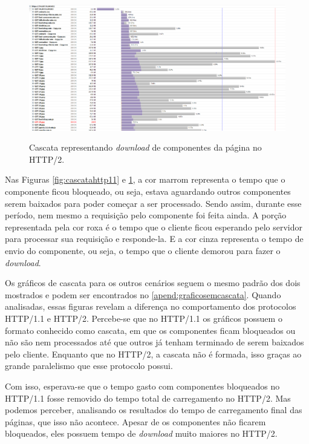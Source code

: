 \begin{landscape}
	\begin{figure}[!htbp]
    	\centering
	    \caption{Cascata representando \textit{download} de componentes da página no HTTP/2.}
    	\includegraphics[width=1.5\textwidth]{./04-figuras/analise-de-resultados/cascata_http2}
	    \label{fig:cascatahttp2}
	\end{figure}
\end{landscape}

Nas Figuras \ref{fig:cascatahttp11} e \ref{fig:cascatahttp2}, a cor marrom representa o tempo que o componente ficou bloqueado, ou seja, estava aguardando outros componentes serem baixados para poder começar a ser processado. Sendo assim, durante esse período, nem mesmo a requisição pelo componente foi feita ainda. A porção representada pela cor roxa é o tempo que o cliente ficou esperando pelo servidor para processar sua requisição e responde-la. E a cor cinza representa o tempo de envio do componente, ou seja, o tempo que o cliente demorou para fazer o \textit{download}.

Os gráficos de cascata para os outros cenários seguem o mesmo padrão dos dois mostrados e podem ser encontrados no \autoref{apend:graficosemcascata}. Quando analisadas, essas figuras revelam a diferença no comportamento dos protocolos HTTP/1.1 e HTTP/2. Percebe-se que no HTTP/1.1 os gráficos possuem o formato conhecido como cascata, em que os componentes ficam bloqueados ou não são nem processados até que outros já tenham terminado de serem baixados pelo cliente. Enquanto que no HTTP/2, a cascata não é formada, isso graças ao grande paralelismo que esse protocolo possui.

Com isso, esperava-se que o tempo gasto com componentes bloqueados no HTTP/1.1 fosse removido do tempo total de carregamento no HTTP/2. Mas podemos perceber, analisando os resultados do tempo de carregamento final das páginas, que isso não acontece. Apesar de os componentes não ficarem bloqueados, eles possuem tempo de \textit{download} muito maiores no HTTP/2.

